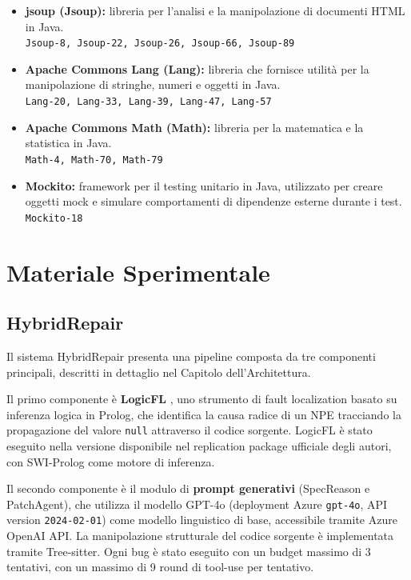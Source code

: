 \begin{itemize}
    \item \textbf{jsoup (Jsoup):} libreria per l'analisi e la manipolazione di documenti HTML 
    in Java.\\
    \texttt{Jsoup-8, Jsoup-22, Jsoup-26, Jsoup-66, Jsoup-89}
    
    \item \textbf{Apache Commons Lang (Lang):} libreria che fornisce utilità per la 
    manipolazione di stringhe, numeri e oggetti in Java.\\
    \texttt{Lang-20, Lang-33, Lang-39, Lang-47, Lang-57}
    
    \item \textbf{Apache Commons Math (Math):} libreria per la matematica e la statistica in 
    Java.\\
    \texttt{Math-4, Math-70, Math-79}
    
    \item \textbf{Mockito:} framework per il testing unitario in Java, utilizzato per creare 
    oggetti mock e simulare comportamenti di dipendenze esterne durante i test.\\
    \texttt{Mockito-18}
\end{itemize}


\section{Materiale Sperimentale}

\subsection{HybridRepair}

Il sistema HybridRepair presenta una pipeline composta da tre componenti principali, 
descritti in dettaglio nel Capitolo dell'Architettura.

Il primo componente è \textbf{LogicFL} \cite{kim2024identifying}, uno strumento di fault localization 
basato su inferenza logica in Prolog, che identifica la causa radice di un NPE tracciando 
la propagazione del valore \texttt{null} attraverso il codice sorgente. LogicFL è stato 
eseguito nella versione disponibile nel replication package ufficiale degli autori, con 
SWI-Prolog come motore di inferenza.

Il secondo componente è il modulo di \textbf{prompt generativi} (SpecReason e PatchAgent),
che utilizza il modello GPT-4o (deployment Azure \texttt{gpt-4o}, API version \texttt{2024-02-01}) come modello linguistico di base,
accessibile tramite Azure OpenAI API. La manipolazione strutturale del codice sorgente
è implementata tramite Tree-sitter. Ogni bug è stato eseguito con un budget massimo di
3 tentativi, con un massimo di 9 round di tool-use per tentativo.

